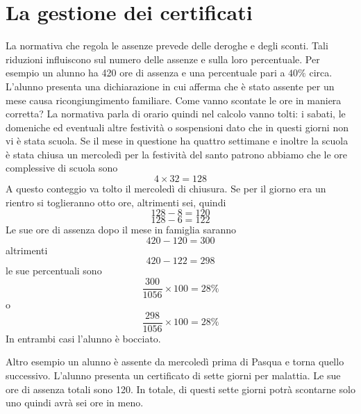 \documentclass{article}
\begin{document}
\section*{La gestione dei certificati}
La normativa che regola le assenze prevede delle deroghe e degli sconti. Tali riduzioni influiscono sul numero delle assenze e sulla loro percentuale. 
Per esempio un alunno ha 420 ore di assenza e una percentuale pari a $40\%$ circa. L'alunno presenta una dichiarazione in cui afferma che è stato assente per un mese causa ricongiungimento familiare. Come vanno scontate le ore in maniera corretta? 
La normativa parla di orario quindi nel calcolo vanno tolti: i sabati, le domeniche ed eventuali altre festività o sospensioni dato che in questi giorni non vi è stata scuola. Se il mese in questione ha quattro settimane e inoltre la scuola è stata chiusa un mercoledì per la festività del santo patrono abbiamo che le ore complessive di scuola sono \[4\times 32=128\]
A questo conteggio va tolto il mercoledì di chiusura. Se per il giorno era un rientro si toglieranno otto ore, altrimenti sei, quindi 
\[128-8=120\]
\[128-6=122\]
Le sue ore di assenza dopo il mese in famiglia saranno
\[420-120=300\]
altrimenti
\[420-122=298\]
le sue percentuali
sono \[\dfrac{300}{1056}\times 100=28\%\] o \[\dfrac{298}{1056}\times 100=28\%\] In entrambi casi l'alunno è bocciato.

Altro esempio un alunno è assente da mercoledì prima di Pasqua e torna quello successivo. L'alunno presenta un certificato di sette giorni per malattia. Le sue ore di assenza totali sono 120.
In totale, di questi sette giorni potrà scontarne solo uno quindi avrà sei ore in meno.





\nocite{*}
\printbibliography
\end{document}
